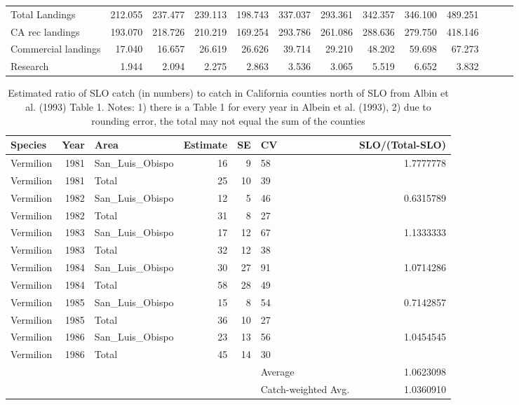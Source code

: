 \documentclass[
  english,
  a4paper,
]{article}
\begin{document}
\begin{table}
{\begin{tabular}[t]{lrrrrrrrrrrrr}
\hspace{1em}Total Landings & 212.055 & 237.477 & 239.113 & 198.743 & 337.037 & 293.361 & 342.357 & 346.100 & 489.251 &  &  & \\
\hspace{1em}CA rec landings & 193.070 & 218.726 & 210.219 & 169.254 & 293.786 & 261.086 & 288.636 & 279.750 & 418.146 &  &  & \\
\hspace{1em}Commercial landings & 17.040 & 16.657 & 26.619 & 26.626 & 39.714 & 29.210 & 48.202 & 59.698 & 67.273 &  &  & \\
\hspace{1em}Research & 1.944 & 2.094 & 2.275 & 2.863 & 3.536 & 3.065 & 5.519 & 6.652 & 3.832 &  &  & \\
\bottomrule
\end{tabular}}
\end{table}





\begin{table}

\caption{\label{tab:albin}Estimated ratio of SLO catch (in numbers) to catch in California 
  counties north of SLO from Albin et al. (1993) Table 1.  Notes: 1) there is a Table 
  1 for every year in Albein et al. (1993), 2) due to rounding error, the total may not 
  equal the sum of the counties}
\centering
\fontsize{10}{12}\selectfont
\begin{tabular}[t]{lrlrrlr}
\toprule
Species & Year & Area & Estimate & SE & CV & SLO/(Total-SLO)\\
\midrule
Vermilion & 1981 & San\_Luis\_Obispo & 16 & 9 & 58 & 1.7777778\\
Vermilion & 1981 & Total & 25 & 10 & 39 & \\
Vermilion & 1982 & San\_Luis\_Obispo & 12 & 5 & 46 & 0.6315789\\
Vermilion & 1982 & Total & 31 & 8 & 27 & \\
Vermilion & 1983 & San\_Luis\_Obispo & 17 & 12 & 67 & 1.1333333\\
\addlinespace
Vermilion & 1983 & Total & 32 & 12 & 38 & \\
Vermilion & 1984 & San\_Luis\_Obispo & 30 & 27 & 91 & 1.0714286\\
Vermilion & 1984 & Total & 58 & 28 & 49 & \\
Vermilion & 1985 & San\_Luis\_Obispo & 15 & 8 & 54 & 0.7142857\\
Vermilion & 1985 & Total & 36 & 10 & 27 & \\
\addlinespace
Vermilion & 1986 & San\_Luis\_Obispo & 23 & 13 & 56 & 1.0454545\\
Vermilion & 1986 & Total & 45 & 14 & 30 & \\
 &  &  &  &  & Average & 1.0623098\\
 &  &  &  &  & Catch-weighted Avg. & 1.0360910\\
\bottomrule
\end{tabular}
\end{table}
\end{document}
